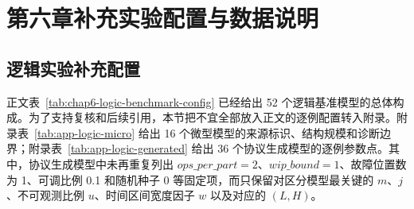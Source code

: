 \documentclass[master,fontset=ubuntu]{shnuthesis}
\theoremstyle{definition}
\begin{document}

\appendix
\chapter{第六章补充实验配置与数据说明}

\section{逻辑实验补充配置}

正文表~\ref{tab:chap6-logic-benchmark-config} 已经给出 52 个逻辑基准模型的总体构成。为了支持复核和后续引用，本节把不宜全部放入正文的逐例配置转入附录。附录表~\ref{tab:app-logic-micro} 给出 16 个微型模型的来源标识、结构规模和诊断边界；附录表~\ref{tab:app-logic-generated} 给出 36 个协议生成模型的逐例参数点。其中，协议生成模型中未再重复列出 $ops\_per\_part=2$、$wip\_bound=1$、故障位置数为 1、可调比例 0.1 和随机种子 0 等固定项，而只保留对区分模型最关键的 $m$、$j$、不可观测比例 $u$、时间区间宽度因子 $w$ 以及对应的 $(L,H)$。
\end{document}
